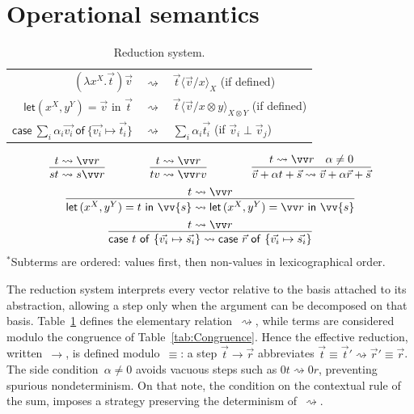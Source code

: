 \documentclass[a4paper,UKenglish,numberwithinsect,pdfa,anonymous]{lipics-v2021}
\theoremstyle{restatestyle}
\newcommand\lra{\longrightarrow}
\def\Pair#1#2{(#1,#2)} %
\def\letkeyword{\mathsf{let}}
\def\inkeyword{\mathsf{in}}
\def\LetP#1#2#3#4#5#6{\letkeyword\,\Pair{#1^{#2}}{#3^{#4}}=#5~\inkeyword~#6}
\def\gencasei#1#2#3{\ensuremath{\mathsf{case}~#1~\mathsf{of}~\{#2\mapsto #3\}}}
\def\lraneq{\rightsquigarrow}
\begin{document}
\section{Operational semantics}\label{sec:reduction}
\begin{table}[t]
  \centering
  \begin{tabular}{r@{~}c@{~}l}
    $(\lambda x^X.\vec{t})\vec{v}$ & $\lraneq$ & $\vec{t}\langle\vec{v}/x\rangle_X$ \hfill (if defined) \\
    $\mathsf{let} (x^X, y^Y) = \vec{v} \text{ in } \vec{t}$ & $\lraneq$ & $\vec{t}\langle\vec{v}/x \otimes y\rangle_{X \otimes Y}$ \hfill (if defined) \\
    $\gencasei{\sum_{i}\alpha_i \vec{v_i}}{\vec{v_i}}{\vec{t_i}}$ & $\lraneq$ & $\sum_{i}\alpha_i \vec{t_i}$ \hfill (if $\vec{v}_i \perp \vec{v}_j$) \\
  \end{tabular}
  \[
    \begin{array}{c}
      \infer{st\lraneq s\vv r}{t\lraneq \vv r}
      \qquad\qquad
      \infer{tv\lraneq \vv rv}{t\lraneq\vv r}
      \qquad\qquad
      \infer{\vec v+\alpha t+\vec s \lraneq \vec v+\alpha \vec r+\vec s}{t\lraneq\vv r & \alpha\neq 0}
      \\[5pt]
      \infer{\LetP{x}{X}{y}{Y}{t}{\vv{s}}\lraneq
      \LetP{x}{X}{y}{Y}{\vv r}{\vv{s}}}{t\lraneq \vv r} 
      \\[5pt]
      \infer{
        \gencasei{t}{\vec{v_i}}{\vec{s_i}} \lraneq 
        \gencasei{\vec r}{\vec{v_i}}{\vec{s_i}}}
      {t\lraneq \vv r}
    \end{array}
  \]
  \noindent\footnotesize $^*$Subterms are ordered: values first, then non-values in lexicographical order.
  \caption{Reduction system.}
  \label{tab:Reduction}
\end{table}
The reduction system interprets every vector relative to the basis attached to
its abstraction, allowing a step only when the argument can be decomposed on
that basis.  
Table~\ref{tab:Reduction} defines the elementary relation~$\lraneq$, while terms are
considered modulo the congruence of Table~\ref{tab:Congruence}.  
Hence the effective reduction, written~$\lra$, is defined modulo~$\equiv$:
a step $\vec t\lra\vec r$ abbreviates $\vec t\equiv\vec t'\lraneq\vec r'\equiv\vec r$.
The side condition~$\alpha\neq0$ avoids vacuous steps such as
$0t\lraneq0r$, preventing spurious nondeterminism. On that note,
the condition on the contextual rule of the sum, imposes a strategy
preserving the determinism of~$\lraneq$.
\end{document}

